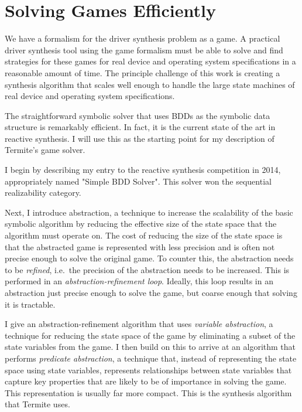 \chapter{Solving Games Efficiently}
\label{ch:solving}

We have a formalism for the driver synthesis problem as a game. A practical driver synthesis tool using the game formalism must be able to solve and find strategies for these games for real device and operating system specifications in a reasonable amount of time. The principle challenge of this work is creating a synthesis algorithm that scales well enough to handle the large state machines of real device and operating system specifications. 

The straightforward symbolic solver that uses BDDs as the symbolic data structure is remarkably efficient. In fact, it is the current state of the art in reactive synthesis. I will use this as the starting point for my description of Termite's game solver.

I begin by describing my entry to the reactive synthesis competition in 2014, appropriately named "Simple BDD Solver". This solver won the sequential realizability category.

Next, I introduce abstraction, a technique to increase the scalability of the basic symbolic algorithm by reducing the effective size of the state space that the algorithm must operate on. The cost of reducing the size of the state space is that the abstracted game is represented with less precision and is often not precise enough to solve the original game. To counter this, the abstraction needs to be \emph{refined}, i.e.\ the precision of the abstraction needs to be increased. This is performed in an \emph{abstraction-refinement loop}. Ideally, this loop results in an abstraction just precise enough to solve the game, but coarse enough that solving it is tractable.

I give an abstraction-refinement algorithm that uses \emph{variable abstraction}, a technique for reducing the state space of the game by eliminating a subset of the state variables from the game. I then build on this to arrive at an algorithm that performs \emph{predicate abstraction}, a technique that, instead of representing the state space using state variables, represents relationships between state variables that capture key properties that are likely to be of importance in solving the game. This representation is usually far more compact. This is the synthesis algorithm that Termite uses.

